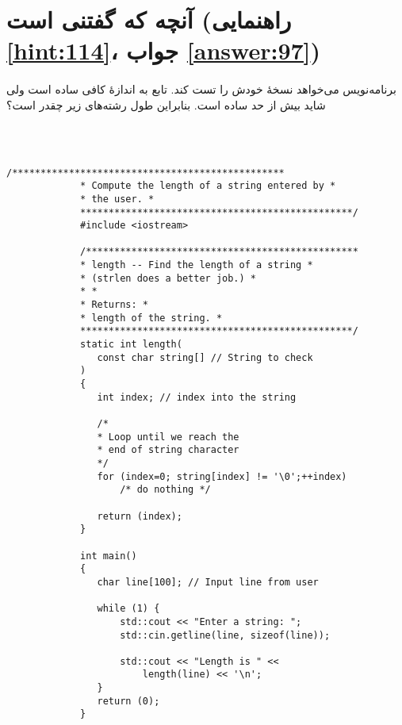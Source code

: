 \section[آنچه که گفتنی است]{آنچه که گفتنی است \protect{} (راهنمایی \ref{hint:114}، جواب \ref{answer:97})}
\paragraph{}\label{prog:23}
برنامه‌نویس می‌خواهد نسخهٔ  خودش را تست کند. تابع به اندازهٔ کافی ساده است ولی شاید بیش از حد ساده است. بنابراین طول رشته‌های زیر چقدر است؟

\LTR\noindent
{}\\
\\

\begin{LTR}
        \begin{lstlisting}[style=C++Style]
             /************************************************
             * Compute the length of a string entered by *
             * the user. *
             ************************************************/
             #include <iostream>

             /************************************************
             * length -- Find the length of a string *
             * (strlen does a better job.) *
             * *
             * Returns: *
             * length of the string. *
             ************************************************/
             static int length(
             	const char string[] // String to check
             )
             {
             	int index; // index into the string

             	/*
             	* Loop until we reach the
             	* end of string character
             	*/
             	for (index=0; string[index] != '\0';++index)
             		/* do nothing */

            	return (index);
             }

             int main()
             {
             	char line[100]; // Input line from user

             	while (1) {
             		std::cout << "Enter a string: ";
             		std::cin.getline(line, sizeof(line));

             		std::cout << "Length is " <<
             			length(line) << '\n';
             	}
             	return (0);
             }
        \end{lstlisting}
\end{LTR}